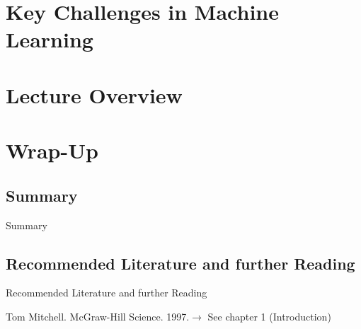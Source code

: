 
\section{Key Challenges in Machine Learning}

\begin{frame}{}{}

\end{frame}



\section{Lecture Overview}




\section{Wrap-Up}
\subsection{Summary}

\begin{frame}{Summary}{}

\end{frame}


\subsection{Recommended Literature and further Reading}

\begin{frame}{Recommended Literature and further Reading}{}
	\footnotesize
	\begin{thebibliography}{2}
			{Tom Mitchell. McGraw-Hill Science. 1997.}{$\rightarrow$ See chapter 1 (Introduction)}
	\end{thebibliography}
\end{frame}


